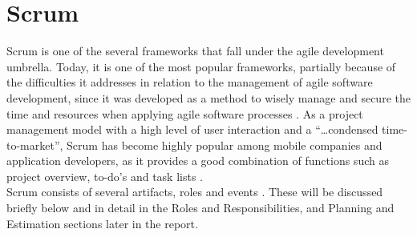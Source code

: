 
\section{Scrum}
Scrum is one of the several frameworks that fall under the agile development umbrella. Today, it is one of the most popular frameworks, partially because of the difficulties it addresses in relation to the management of agile software development, since it was developed as a method to wisely manage and secure the time and resources when applying agile software processes \cite{Sommerville}. As a project management model with a high level of user interaction and a “…condensed time-to-market”, Scrum has become highly popular among mobile companies and application developers, as it provides a good combination of functions such as project overview, to-do’s and task lists \cite{Flora}.
\\
Scrum consists of several artifacts, roles and events \cite{Schwaber}. These will be discussed briefly below and in detail in the Roles and Responsibilities, and Planning and Estimation sections later in the report.

